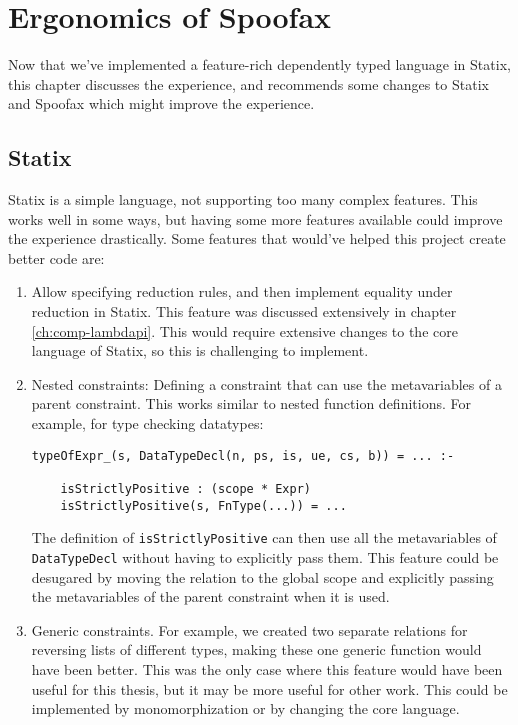 \chapter{Ergonomics of Spoofax}
\label{ch:ergonomics}

Now that we've implemented a feature-rich dependently typed language in Statix, this chapter discusses the experience, and recommends some changes to Statix and Spoofax which might improve the experience. 

\section{Statix}

Statix is a simple language, not supporting too many complex features. This works well in some ways, but having some more features available could improve the experience drastically. Some features that would've helped this project create better code are:

\begin{enumerate}
	\item Allow specifying reduction rules, and then implement equality under reduction in Statix. This feature was discussed extensively in chapter \ref{ch:comp-lambdapi}. This would require extensive changes to the core language of Statix, so this is challenging to implement.
	
	\item Nested constraints: Defining a constraint that can use the metavariables of a parent constraint. This works similar to nested function definitions. For example, for type checking datatypes:
	\begin{lstlisting}
typeOfExpr_(s, DataTypeDecl(n, ps, is, ue, cs, b)) = ... :-

	isStrictlyPositive : (scope * Expr)
	isStrictlyPositive(s, FnType(...)) = ...
	\end{lstlisting}
	The definition of \texttt{isStrictlyPositive} can then use all the metavariables of \\ \texttt{DataTypeDecl} without having to explicitly pass them. This feature could be desugared by moving the relation to the global scope and explicitly passing the metavariables of the parent constraint when it is used.
	
	\item Generic constraints. For example, we created two separate relations for reversing lists of different types, making these one generic function would have been better. This was the only case where this feature would have been useful for this thesis, but it may be more useful for other work. This could be implemented by monomorphization or by changing the core language. 
\end{enumerate}

